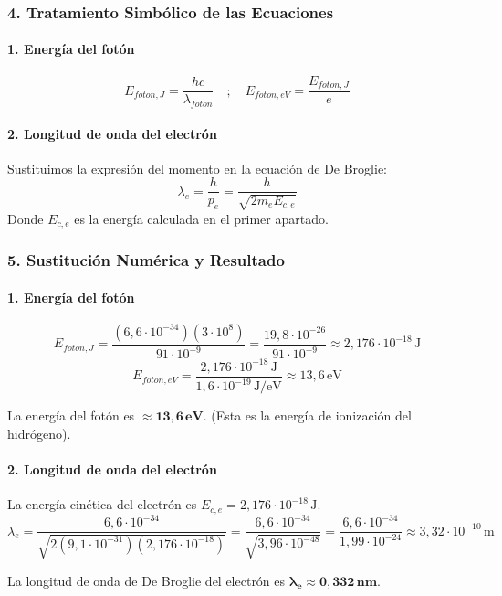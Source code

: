 \subsubsection*{4. Tratamiento Simbólico de las Ecuaciones}
\paragraph{1. Energía del fotón}
$$ E_{foton, J} = \frac{hc}{\lambda_{foton}} \quad ; \quad E_{foton, eV} = \frac{E_{foton, J}}{e} $$
\paragraph{2. Longitud de onda del electrón}
Sustituimos la expresión del momento en la ecuación de De Broglie:
$$ \lambda_e = \frac{h}{p_e} = \frac{h}{\sqrt{2m_e E_{c,e}}} $$
Donde $E_{c,e}$ es la energía calculada en el primer apartado.

\subsubsection*{5. Sustitución Numérica y Resultado}
\paragraph{1. Energía del fotón}
$$ E_{foton, J} = \frac{(6,6\cdot10^{-34})(3\cdot10^8)}{91\cdot10^{-9}} = \frac{19,8\cdot10^{-26}}{91\cdot10^{-9}} \approx 2,176 \cdot 10^{-18} \, \text{J} $$
$$ E_{foton, eV} = \frac{2,176 \cdot 10^{-18} \, \text{J}}{1,6\cdot10^{-19} \, \text{J/eV}} \approx 13,6 \, \text{eV} $$
\begin{cajaresultado}
    La energía del fotón es $\boldsymbol{\approx 13,6 \, \textbf{eV}}$. (Esta es la energía de ionización del hidrógeno).
\end{cajaresultado}

\paragraph{2. Longitud de onda del electrón}
La energía cinética del electrón es $E_{c,e} = 2,176 \cdot 10^{-18} \, \text{J}$.
$$ \lambda_e = \frac{6,6\cdot10^{-34}}{\sqrt{2(9,1\cdot10^{-31})(2,176 \cdot 10^{-18})}} = \frac{6,6\cdot10^{-34}}{\sqrt{3,96 \cdot 10^{-48}}} = \frac{6,6\cdot10^{-34}}{1,99 \cdot 10^{-24}} \approx 3,32 \cdot 10^{-10} \, \text{m} $$
\begin{cajaresultado}
    La longitud de onda de De Broglie del electrón es $\boldsymbol{\lambda_e \approx 0,332 \, \textbf{nm}}$.
\end{cajaresultado}

